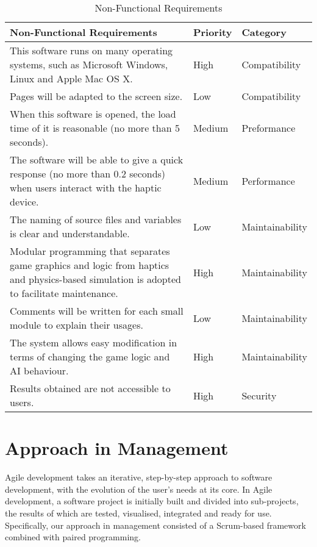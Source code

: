 \documentclass[a4paper]{article}
\begin{document}
\begin{table}[H]
    \centering
    \begin{tabular}{|p{6cm}|p{2cm}|p{3cm}|}
        \hline
        Non-Functional Requirements & Priority & Category \\
        \hline
        This software runs on many operating systems, such as Microsoft Windows, Linux and Apple Mac OS X. &  \cellcolor[HTML]{FF9999} High
        &
        Compatibility \\
        \hline
        Pages will be adapted to the screen size. &
        \cellcolor[HTML]{CCFF99}Low &
        Compatibility \\
        \hline
        When this software is opened, the load time of it is reasonable (no more than 5 seconds). &
        \cellcolor[HTML]{FFFF99} Medium &
        Preformance \\
        \hline
        The software will be able to give a quick response (no more than 0.2 seconds) when users interact with the haptic device. &
        \cellcolor[HTML]{FFFF99} Medium &
        Performance \\
        \hline
        The naming of source files and variables is clear and understandable. &
        \cellcolor[HTML]{CCFF99}Low &
        Maintainability \\
        \hline
        Modular programming that separates game graphics and logic from haptics and physics-based simulation is adopted to facilitate maintenance. &
        \cellcolor[HTML]{FF9999} High &
         Maintainability \\
        \hline
        Comments will be written for each small module to explain their usages. &
        \cellcolor[HTML]{CCFF99}Low &
        Maintainability \\
        \hline
        The system allows easy modification in terms of changing the game logic and AI behaviour. &
        \cellcolor[HTML]{FF9999} High &
         Maintainability \\
        \hline
         Results obtained are not accessible to users. &
        \cellcolor[HTML]{FF9999} High &
        Security \\
        \hline
    \end{tabular}
    \caption{Non-Functional Requirements}
    \label{tab:my_label2}
\end{table}

\section{Approach in Management}
Agile development takes an iterative, step-by-step approach to software development, with the evolution of the user’s needs at its core. In Agile development, a software project is initially built and divided into sub-projects, the results of which are tested, visualised, integrated and ready for use. Specifically, our approach in management consisted of a Scrum-based framework combined with paired programming. 
\end{document}
